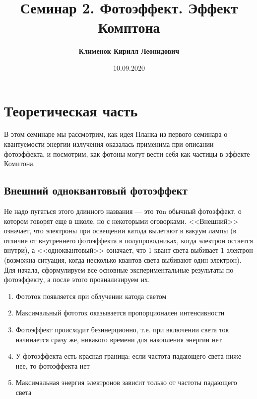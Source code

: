 \documentclass[12pt]{article}
\begin{document}
 

\title{\textbf{Семинар 2. Фотоэффект. Эффект Комптона}}
\author{\textbf{Клименок Кирилл Леонидович}}
\date{10.09.2020}
\maketitle

\section{Теоретическая часть}
В этом семинаре мы рассмотрим, как идея Планка из первого семинара о квантуемости энергии излучения оказалась применима при описании фотоэффекта, и посмотрим, как фотоны могут вести себя как частицы в эффекте Комптона.

\subsection{Внешний одноквантовый фотоэффект}
Не надо пугаться этого длинного названия --- это тоn обычный фотоэффект, о котором говорят еще в школе, но с некоторыми оговорками. <<Внешний>> означает, что электроны при освещении катода вылетают в вакуум лампы (в отличие от внутреннего фотоэффекта в полупроводниках, когда электрон остается внутри), а <<одноквантовый>> означает, что 1 квант света выбивает 1 электрон (возможна ситуация, когда несколько квантов света выбивают один электрон). Для начала, сформулируем все основные экспериментальные результаты по фотоэффекту, а после этого проанализируем их.

\begin{enumerate}
    \item Фототок появляется при облучении катода светом
    \item Максимальный фототок оказывается пропорционален интенсивности
    \item Фотоэффект происходит безинерционно, т.е. при включении света ток начинается сразу же, никакого времени для накопления энергии нет
    \item У фотоэффекта есть красная граница: если частота падающего света ниже нее, то фотоэффекта нет
    \item Максимальная энергия электронов зависит только от частоты падающего света
\end{enumerate}
\end{document}
